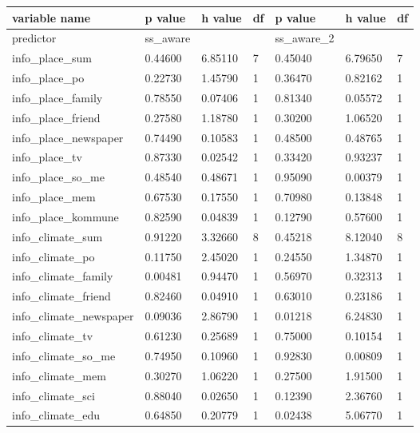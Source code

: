 \begin{table}[!ht]
    \centering
    \begin{tabular}{|l|l|l|l|l|l|l|}
    \hline
        variable name & p value & h value & df & p value & h value & df \\ \hline
        predictor & ss\_aware & ~ & ~ & ss\_aware\_2 & ~ & ~ \\ \hline
        info\_place\_sum & 0.44600 & 6.85110 & 7 & 0.45040 & 6.79650 & 7 \\ \hline
        info\_place\_po & 0.22730 & 1.45790 & 1 & 0.36470 & 0.82162 & 1 \\ \hline
        info\_place\_family & 0.78550 & 0.07406 & 1 & 0.81340 & 0.05572 & 1 \\ \hline
        info\_place\_friend & 0.27580 & 1.18780 & 1 & 0.30200 & 1.06520 & 1 \\ \hline
        info\_place\_newspaper & 0.74490 & 0.10583 & 1 & 0.48500 & 0.48765 & 1 \\ \hline
        info\_place\_tv & 0.87330 & 0.02542 & 1 & 0.33420 & 0.93237 & 1 \\ \hline
        info\_place\_so\_me & 0.48540 & 0.48671 & 1 & 0.95090 & 0.00379 & 1 \\ \hline
        info\_place\_mem & 0.67530 & 0.17550 & 1 & 0.70980 & 0.13848 & 1 \\ \hline
        info\_place\_kommune & 0.82590 & 0.04839 & 1 & 0.12790 & 0.57600 & 1 \\ \hline
        info\_climate\_sum & 0.91220 & 3.32660 & 8 & 0.45218 & 8.12040 & 8 \\ \hline
        info\_climate\_po & 0.11750 & 2.45020 & 1 & 0.24550 & 1.34870 & 1 \\ \hline
        info\_climate\_family & 0.00481 & 0.94470 & 1 & 0.56970 & 0.32313 & 1 \\ \hline
        info\_climate\_friend & 0.82460 & 0.04910 & 1 & 0.63010 & 0.23186 & 1 \\ \hline
        info\_climate\_newspaper & 0.09036 & 2.86790 & 1 & 0.01218 & 6.24830 & 1 \\ \hline
        info\_climate\_tv & 0.61230 & 0.25689 & 1 & 0.75000 & 0.10154 & 1 \\ \hline
        info\_climate\_so\_me & 0.74950 & 0.10960 & 1 & 0.92830 & 0.00809 & 1 \\ \hline
        info\_climate\_mem & 0.30270 & 1.06220 & 1 & 0.27500 & 1.91500 & 1 \\ \hline
        info\_climate\_sci & 0.88040 & 0.02650 & 1 & 0.12390 & 2.36760 & 1 \\ \hline
        info\_climate\_edu & 0.64850 & 0.20779 & 1 & 0.02438 & 5.06770 & 1 \\ \hline
    \end{tabular}
\end{table}


